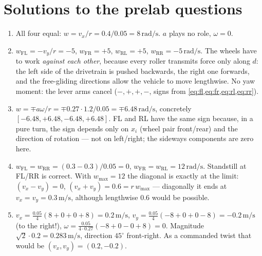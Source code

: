 \documentclass[12pt,a4paper]{scrartcl}
\begin{document}
\section{Solutions to the prelab questions}\label{sec:loesungen}
\begin{enumerate}
  \item All four equal: \(w = v_x/r = 0.4/0.05 = 8\,\mathrm{rad/s}\).
        \(a\) plays no role, \(\omega=0\).
  \item \(w_\text{FL} = -v_y/r = -5\), \(w_\text{FR} = +5\), \(w_\text{RL} = +5\),
        \(w_\text{RR} = -5\,\mathrm{rad/s}\). The wheels have to work
        \emph{against each other}, because every roller transmits force only along
        \(d\): the left side of the drivetrain is pushed backwards, the right one
        forwards, and the free-gliding directions allow the vehicle to move lengthwise.
        No yaw moment: the lever arms cancel (\(-,+ ,+,-\), signs from \cref{eq:fl,eq:fr,eq:rl,eq:rr}).
  \item \(w = \mp a\omega/r = \mp 0.27\cdot1.2/0.05 = \mp 6.48\,\mathrm{rad/s}\),
        concretely \([-6.48, +6.48, -6.48, +6.48]\). FL and RL have the same
        sign because, in a pure turn, the sign depends only on \(x_i\) (wheel pair
        front/rear) and the direction of rotation — not on left/right; the
        sideways components are zero here.
  \item \(w_\text{FL} = w_\text{RR} = (0.3-0.3)/0.05 = 0\),
        \(w_\text{FR} = w_\text{RL} = 12\,\mathrm{rad/s}\). Standstill at FL/RR is
        correct. With \(w_{\max}=12\) the diagonal is exactly at the limit:
        \((v_x - v_y) = 0\), \((v_x+v_y)=0.6 = r\,w_{\max}\) — diagonally it ends at
        \(v_x = v_y = 0.3\,\mathrm{m/s}\), although lengthwise \(0.6\) would be possible.
  \item \(v_x = \tfrac{0.05}{4}(8+0+0+8) = 0.2\,\mathrm{m/s}\),
        \(v_y = \tfrac{0.05}{4}(-8+0+0-8) = -0.2\,\mathrm{m/s}\) (to the right!),
        \(\omega = \tfrac{0.05}{4\cdot0.27}(-8+0-0+8) = 0\). Magnitude
        \(\sqrt{2}\cdot0.2 = 0.283\,\mathrm{m/s}\), direction \(45^\circ\)
        front-right. As a commanded twist that would be \((v_x, v_y) = (0.2, -0.2)\).
\end{enumerate}
\end{document}
